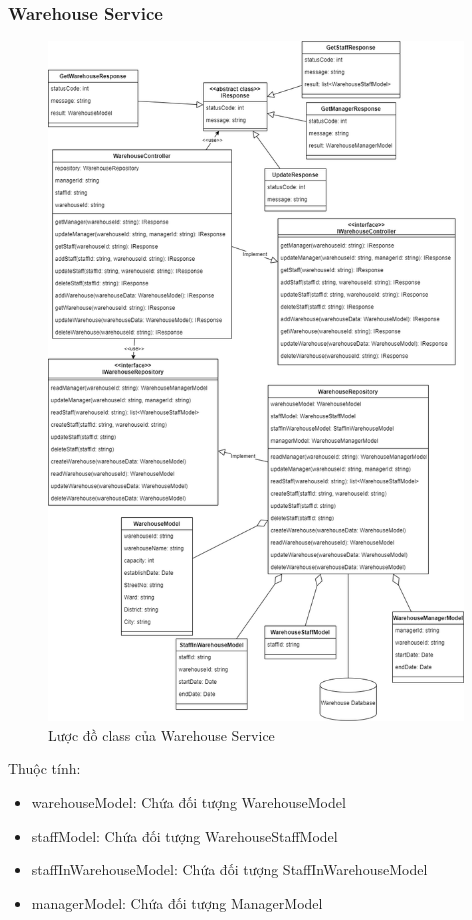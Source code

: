 \subsubsection{Warehouse Service}
\begin{figure}[!htp]
	\centering
	\includegraphics[width=11cm]{img/Architecture/service/WarehouseService.png}
	\newline
	\caption{Lược đồ class của Warehouse Service}
\end{figure}
Thuộc tính:
\begin{itemize}
	\item warehouseModel: Chứa đối tượng WarehouseModel
	\item staffModel: Chứa đối tượng WarehouseStaffModel
	\item staffInWarehouseModel: Chứa đối tượng StaffInWarehouseModel
	\item managerModel: Chứa đối tượng ManagerModel
\end{itemize}
